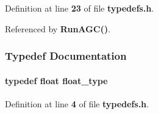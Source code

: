 Definition at line {\bf 23} of file {\bf typedefs.\+h}.



Referenced by {\bf Run\+A\+G\+C()}.



\subsubsection{Typedef Documentation}
\paragraph[{float\+\_\+type}]{\setlength{\rightskip}{0pt plus 5cm}typedef float {\bf float\+\_\+type}}\label{typedefs_8h_a4006252ff6772953667c24fa548f20ed}


Definition at line {\bf 4} of file {\bf typedefs.\+h}.

